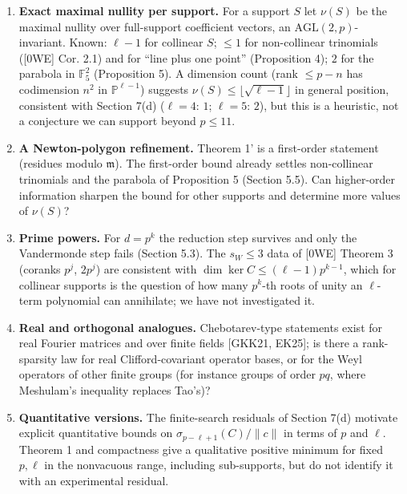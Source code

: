 \documentclass[
  11pt,
  a4paper,
]{article}
\providecommand{\tightlist}{%
  \setlength{\itemsep}{0pt}\setlength{\parskip}{0pt}}
\begin{document}
\begin{enumerate}
\def\labelenumi{\arabic{enumi}.}
\tightlist
\item
  \textbf{Exact maximal nullity per support.} For a support \(S\) let
  \(\nu(S)\) be the maximal nullity over full-support coefficient
  vectors, an \(\mathrm{AGL}(2,\allowbreak{}p)\)-invariant. Known: \(\ell-1\) for
  collinear \(S\); \(\le1\) for non-collinear trinomials ({[}0WE{]} Cor.
  2.1) and for ``line plus one point'' (Proposition 4); \(2\) for the
  parabola in \(\mathbb F_5^2\) (Proposition 5). A dimension count (rank
  \(\le p-n\) has codimension \(n^2\) in \(\mathbb P^{\ell-1}\))
  suggests \(\nu(S)\le\lfloor\sqrt{\ell-1}\rfloor\) in general position,
  consistent with Section 7(d) (\(\ell=4\): \(1\); \(\ell=5\): \(2\)),
  but this is a heuristic, not a conjecture we can support beyond
  \(p\le11\).
\item
  \textbf{A Newton-polygon refinement.} Theorem 1' is a first-order
  statement (residues modulo \(\mathfrak m\)). The first-order bound
  already settles non-collinear trinomials and the parabola of
  Proposition 5 (Section 5.5). Can higher-order information sharpen the
  bound for other supports and determine more values of \(\nu(S)\)?
\item
  \textbf{Prime powers.} For \(d=p^k\) the reduction step survives and
  only the Vandermonde step fails (Section 5.3). The \(s_W\le3\) data of
  {[}0WE{]} Theorem 3 (coranks \(p^j\), \(2p^j\)) are consistent with
  \(\dim\ker C\le(\ell-1)p^{k-1}\), which for collinear supports is the
  question of how many \(p^k\)-th roots of unity an \(\ell\)-term
  polynomial can annihilate; we have not investigated it.
\item
  \textbf{Real and orthogonal analogues.} Chebotarev-type statements
  exist for real Fourier matrices and over finite fields {[}GKK21,
  EK25{]}; is there a rank-sparsity law for real Clifford-covariant
  operator bases, or for the Weyl operators of other finite groups (for
  instance groups of order \(pq\), where Meshulam's inequality replaces
  Tao's)?
\item
  \textbf{Quantitative versions.} The finite-search residuals of Section
  7(d) motivate explicit quantitative bounds on
  \(\sigma_{p-\ell+1}(C)/\|c\|\) in terms of \(p\) and \(\ell\). Theorem
  1 and compactness give a qualitative positive minimum for fixed
  \(p,\allowbreak{}\ell\) in the nonvacuous range, including sub-supports, but do not
  identify it with an experimental residual.
\end{enumerate}
\end{document}
